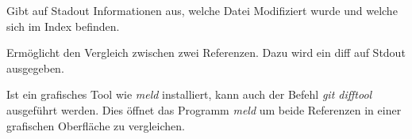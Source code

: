 \label{sec:git-commands.advanced.status}
Gibt auf Stadout Informationen aus, welche Datei Modifiziert wurde und welche sich im Index befinden.

\label{sec:git-commands.advanced.diff}
Ermöglicht den Vergleich zwischen zwei Referenzen. Dazu wird ein diff auf Stdout ausgegeben.

\begin{INFO}
  Ist ein grafisches Tool wie \textit{meld} installiert, kann auch der Befehl \textit{git difftool} ausgeführt werden. Dies öffnet das Programm \textit{meld} um beide Referenzen in einer grafischen Oberfläche zu vergleichen.
\end{INFO}





